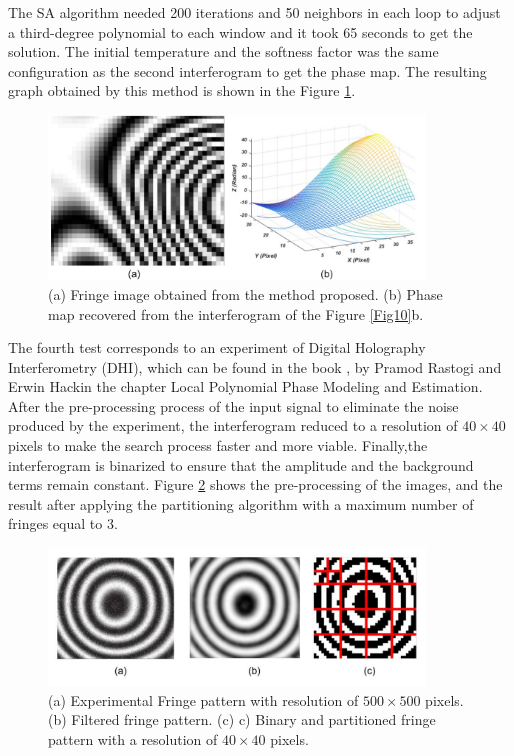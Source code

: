 \documentclass[review]{elsarticle}
\begin{document}
The SA algorithm needed 200 iterations and 50 neighbors in each loop to adjust a third-degree polynomial to each window and it took 65 seconds to get the solution. The initial temperature and the softness factor was the same configuration as the second interferogram to get the phase map. The resulting  graph obtained by this method is shown in the Figure \ref{Fig11}.

\begin{figure}[ht!]
\centering\includegraphics[width=10cm]{fig11}
\caption{(a) Fringe image obtained from the method proposed. (b) Phase map recovered from the interferogram of the Figure \ref{Fig10}b.}
\label{Fig11}
\end{figure}

The fourth test corresponds to an experiment of Digital Holography Interferometry (DHI), which can be found in the book \cite{rastogi2014phase}, by Pramod Rastogi and Erwin Hackin the chapter Local Polynomial Phase Modeling and Estimation. After the pre-processing process of the input signal to eliminate the noise produced by the experiment, the interferogram reduced to a resolution of $40\times40$ pixels to make the search process faster and more viable. Finally,the interferogram is binarized to ensure that the amplitude and the background terms remain constant. Figure \ref{Fig12} shows the pre-processing of the images, and the result after applying the partitioning algorithm with a maximum number of fringes equal to 3.

\begin{figure}[ht!]
\centering\includegraphics[width=10cm]{fig12}
\caption{(a) Experimental Fringe pattern with resolution of $500\times 500$ pixels. (b) Filtered fringe pattern. (c) c)	Binary and partitioned fringe pattern with a resolution of $40 \times 40$ pixels.}
\label{Fig12}
\end{figure}
\end{document}
